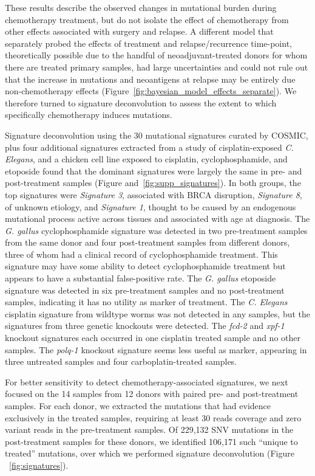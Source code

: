 These results describe the observed changes in mutational burden during chemotherapy treatment, but do not isolate the effect of chemotherapy from other effects associated with surgery and relapse. A different model that separately probed the effects of treatment and relapse/recurrence time-point, theoretically possible due to the handful of neoadjuvant-treated donors for whom there are treated primary samples, had large uncertainties and could not rule out that the increase in mutations and neoantigens at relapse may be entirely due non-chemotherapy effects (Figure~\ref{fig:bayesian_model_effects_separate}). We therefore turned to signature deconvolution to assess the extent to which specifically chemotherapy induces mutations.

Signature deconvolution using the 30 mutational signatures curated by COSMIC\cite{364242}, plus four additional signatures extracted from a study of cisplatin-exposed \textit{C. Elegans}\cite{Meier_2014}, and a chicken cell line exposed to cisplatin, cyclophosphamide, and etoposide\cite{Szikriszt_2016} found that the dominant signatures were largely the same in pre- and post-treatment samples (Figure and~\ref{fig:supp_signatures}). In both groups, the top signatures were \textit{Signature 3}, associated with BRCA disruption, \textit{Signature 8}, of unknown etiology, and \textit{Signature 1}, thought to be caused by an endogenous mutational process active across tissues and associated with age at diagnosis. The \textit{G. gallus} cyclophosphamide signature was detected in two pre-treatment samples from the same donor and four post-treatment samples from different donors, three of whom had a clinical record of cyclophosphamide treatment. This signature may have some ability to detect cyclophosphamide treatment but appears to have a substantial false-positive rate. The \textit{G. gallus} etoposide signature was detected in six pre-treatment samples and no post-treatment samples, indicating it has no utility as marker of treatment. The \textit{C. Elegans} cisplatin signature from wildtype worms was not detected in any samples, but the signatures from three genetic knockouts were detected. The \textit{fcd-2} and \textit{xpf-1} knockout signatures each occurred in one cisplatin treated sample and no other samples. The \textit{polq-1} knockout signature seems less useful as marker, appearing in three untreated samples and four carboplatin-treated samples.

For better sensitivity to detect chemotherapy-associated signatures, we next focused on the 14 samples from 12 donors with paired pre- and post-treatment samples. For each donor, we extracted the mutations that had evidence exclusively in the treated samples, requiring at least 30 reads coverage and zero variant reads in the pre-treatment samples. Of 229,132 SNV mutations in the post-treatment samples for these donors, we identified 106,171 such ``unique to treated'' mutations, over which we performed signature deconvolution (Figure ~\ref{fig:signatures}).

